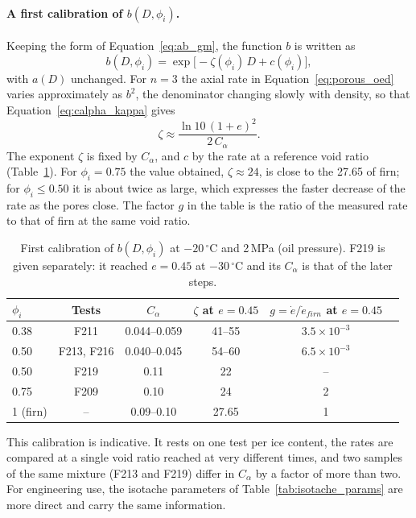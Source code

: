 \paragraph{A first calibration of $b(D,\phi_i)$.} Keeping the form of Equation~\eqref{eq:ab_gm}, the function $b$ is written as
\begin{equation}
    b(D,\phi_i) = \exp\bigl[-\zeta(\phi_i)\,D + c(\phi_i)\bigr],
    \label{eq:b_phi}
\end{equation}
with $a(D)$ unchanged. For $n = 3$ the axial rate in Equation~\eqref{eq:porous_oed} varies approximately as $b^2$, the denominator changing slowly with density, so that Equation~\eqref{eq:calpha_kappa} gives
\begin{equation}
    \zeta \approx \frac{\ln10\,(1+e)^2}{2\,C_\alpha}.
\end{equation}
The exponent $\zeta$ is fixed by $C_\alpha$, and $c$ by the rate at a reference void ratio (Table~\ref{tab:b_calibration}). For $\phi_i = 0.75$ the value obtained, $\zeta\approx24$, is close to the 27.65 of firn; for $\phi_i\le0.50$ it is about twice as large, which expresses the faster decrease of the rate as the pores close. The factor $g$ in the table is the ratio of the measured rate to that of firn at the same void ratio.

\begin{table}[H]
\centering
\small
\begin{tabular}{@{}lccccc@{}}
\toprule
$\phi_i$ & Tests & $C_\alpha$ & $\zeta$ at $e = 0.45$ & $g = \dot e/\dot e_{firn}$ at $e = 0.45$ \\
\midrule
0.38 & F211 & 0.044--0.059 & 41--55 & $3.5\times10^{-3}$ \\
0.50 & F213, F216 & 0.040--0.045 & 54--60 & $6.5\times10^{-3}$ \\
0.50 & F219 & 0.11 & 22 & -- \\
0.75 & F209 & 0.10 & 24 & 2 \\
1 (firn) & -- & 0.09--0.10 & 27.65 & 1 \\
\bottomrule
\end{tabular}
\caption{First calibration of $b(D,\phi_i)$ at $-20\,^\circ$C and 2\,MPa (oil pressure). F219 is given separately: it reached $e = 0.45$ at $-30\,^\circ$C and its $C_\alpha$ is that of the later steps.}
\label{tab:b_calibration}
\end{table}

This calibration is indicative. It rests on one test per ice content, the rates are compared at a single void ratio reached at very different times, and two samples of the same mixture (F213 and F219) differ in $C_\alpha$ by a factor of more than two. For engineering use, the isotache parameters of Table~\ref{tab:isotache_params} are more direct and carry the same information.

